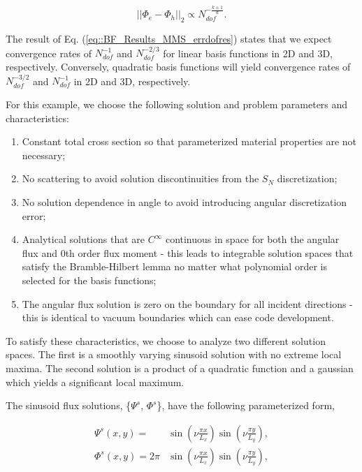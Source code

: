 \begin{equation}
\label{eq::BF_Results_MMS_errdofres}
|| \Phi_{e} - \Phi_h || _{2}  \propto N_{dof}^{- \frac{k+1}{d}} .
\end{equation}

\noindent The result of Eq. (\ref{eq::BF_Results_MMS_errdofres}) states that we expect convergence rates of $N_{dof}^{-1}$ and $N_{dof}^{-2/3}$ for linear basis functions in 2D and 3D, respectively. Conversely, quadratic basis functions will yield convergence rates of $N_{dof}^{-3/2}$ and $N_{dof}^{-1}$ in 2D and 3D, respectively.

For this example, we choose the following solution and problem parameters and characteristics:

\begin{enumerate}
	\item Constant total cross section so that parameterized material properties are not necessary;
	\item No scattering to avoid solution discontinuities from the $S_N$ discretization;
	\item No solution dependence in angle to avoid introducing angular discretization error;
	\item Analytical solutions that are $C^{\infty}$ continuous in space for both the angular flux and 0th order flux moment - this leads to integrable solution spaces that satisfy the Bramble-Hilbert lemma no matter what polynomial order is selected for the basis functions;
	\item The angular flux solution is zero on the boundary for all incident directions - this is identical to vacuum boundaries which can ease code development.
\end{enumerate}

\noindent To satisfy these characteristics, we choose to analyze two different solution spaces. The first is a smoothly varying sinusoid solution with no extreme local maxima. The second solution is a product of a quadratic function and a gaussian which yields a significant local maximum. 

The sinusoid flux solutions, \{$\Psi^s$, $\Phi^s$\}, have the following parameterized form,

\begin{equation}
\label{eq::BF_Results_MMS_sinefluxsols}
\begin{aligned}
\Psi^s (x,y) = &\sin(\nu  \frac{\pi x}{L_x}) \sin(\nu  \frac{\pi y}{L_y}), \\ 
\Phi^s (x,y) = 2 \pi &\sin(\nu  \frac{\pi x}{L_x}) \sin(\nu  \frac{\pi y}{L_y}),
\end{aligned} 
\end{equation}

